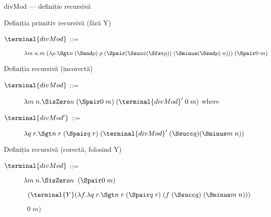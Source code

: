 \documentclass[xcolor=pdftex,romanian,colorlinks]{beamer}
\begin{document}
\begin{frame}{divMod --- definiție recursivă}
  \begin{block}{Definiția primitiv recursivă (fără Y)}
  \begin{description}
  \item[$\terminal{divMod}$ ::= ] $\lambda m\; n. m\; (\lambda p. \Sgt n\; (\Ssnd p)\; p\; (\Spair (\Ssucc (\Sfst p))\; (\Sminus (\Ssnd p)\; n)))\; (\Spair 0\; m)$  
  \end{description}
  \end{block}

  \begin{block}{Definiția recursivă (incorectă)}
  \begin{description}
  \item[$\terminal{divMod}$ ::= ] $\lambda m\; n. \SisZero n\; (\Spair 0\; m)\; (\terminal{divMod}'\; 0\; m)$  where
  \item[$\terminal{divMod'}$ ::= ] $\lambda q\; r. \Sgt n\; r\; (\Spair q\; r)\; (\terminal{divMod}'\; (\Ssucc q) (\Sminus m\; n))$
  \end{description}
  \end{block}

  \begin{block}{Definiția recursivă (corectă, folosind Y)}
  \begin{description}
  \item[$\terminal{divMod}$ ::= ] $\lambda m\; n.\SisZero n\;\;(\Spair 0\; m)$
  
  $\;\;(\terminal{Y} (\lambda f.\lambda q\; r.\Sgt n\; r\; (\Spair q\; r)\; (f\; (\Ssucc q)\; (\Sminus m\; n)))$
  
  $\;\; 0\; m)$
  \end{description}
  \end{block}


\end{frame}
\end{document}
